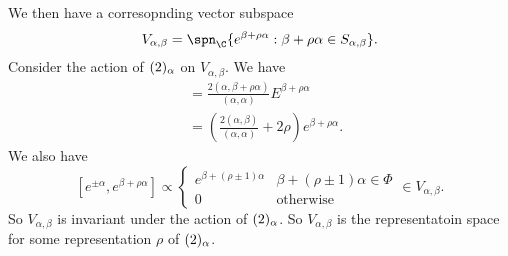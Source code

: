 \documentclass[a4paper]{article}
\begin{document}
We then have a corresopnding vector subspace
\[
  V_{\alpha, \beta} = \spn_\C\{e^{\beta + \rho \alpha}: \beta + \rho \alpha \in S_{\alpha,\beta}\}.
\]
Consider the action of $\sl(2)_\alpha$ on $V_{\alpha, \beta}$. We have
\begin{align*}
  [h^\alpha, e^{\nu + \rho \alpha}] &= \frac{2(\alpha, \beta + \rho \alpha)}{(\alpha, \alpha)}E^{\beta + \rho \alpha}\\
  &= \left(\frac{2 (\alpha, \beta)}{(\alpha, \alpha)} + 2\rho\right)e^{\beta + \rho \alpha}.\tag{$*$}
\end{align*}
We also have
\[
  [e^{\pm \alpha}, e^{\beta + \rho \alpha}] \propto
  \begin{cases}
    e^{\beta + (\rho \pm 1)\alpha} & \beta + (\rho \pm 1) \alpha \in \Phi\\
    0 & \text{otherwise}
  \end{cases} \in V_{\alpha, \beta}.
\]
So $V_{\alpha, \beta}$ is invariant under the action of $\sl(2)_\alpha$. So $V_{\alpha, \beta}$ is the representatoin space for some representation $\rho$ of $\sl(2)_\alpha$.
\end{document}
